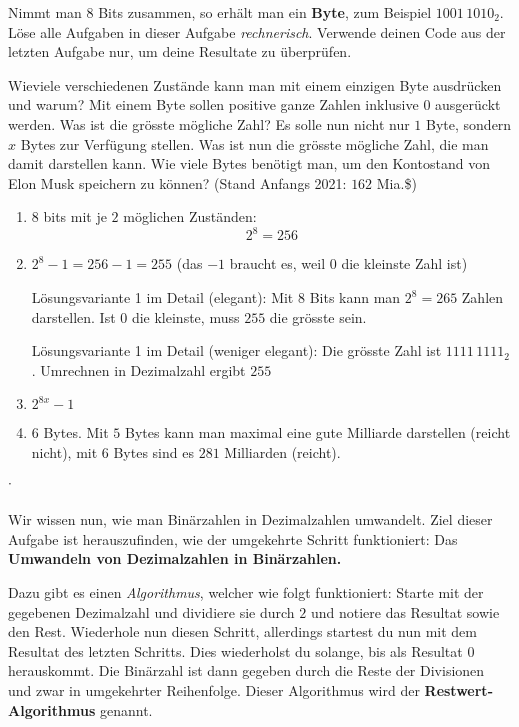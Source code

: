 \newpage

\begin{question}
	Nimmt man $8$ Bits zusammen, so erhält man ein \textbf{Byte}, zum Beispiel $1001\,1010_2$.
	Löse alle Aufgaben in dieser Aufgabe \textit{rechnerisch}. Verwende deinen Code aus der letzten Aufgabe nur, um deine Resultate zu überprüfen.
	\begin{tasks}
		\task Wieviele verschiedenen Zustände kann man mit einem einzigen Byte ausdrücken und warum?
		\task Mit einem Byte sollen positive ganze Zahlen inklusive $0$ ausgerückt werden. Was ist die grösste mögliche Zahl?
		\task Es solle nun nicht nur $1$ Byte, sondern $x$ Bytes zur Verfügung stellen. Was ist nun die grösste mögliche Zahl, die man damit darstellen kann.
		\task Wie viele Bytes benötigt man, um den Kontostand von Elon Musk speichern zu können? (Stand Anfangs 2021: $162$ Mia.\$)
	\end{tasks}
\end{question}
\cprotEnv\begin{solution}
	\begin{enumerate}[label=\alph*)]
		\item $8$ bits mit je $2$ möglichen Zuständen:
		$$2^8 = 256$$
		\item $2^8-1 = 256 - 1 = 255$ (das $-1$ braucht es, weil $0$ die kleinste Zahl ist)

		Lösungsvariante 1 im Detail (elegant): Mit $8$ Bits kann man $2^8 = 265$ Zahlen darstellen. Ist $0$ die kleinste, muss $255$ die grösste sein.

		Lösungsvariante 1 im Detail (weniger elegant):
		Die grösste Zahl ist $1111\,1111_2$. Umrechnen in Dezimalzahl ergibt $255$
		\item $2^{8x}-1$
		\item $6$ Bytes. Mit $5$ Bytes kann man maximal eine gute Milliarde darstellen (reicht nicht), mit $6$ Bytes sind es $281$ Milliarden (reicht).
	\end{enumerate}
\end{solution}

˙\newpage

Wir wissen nun, wie man Binärzahlen in Dezimalzahlen umwandelt.
Ziel dieser Aufgabe ist herauszufinden, wie der umgekehrte Schritt funktioniert: Das \textbf{Umwandeln von Dezimalzahlen in Binärzahlen.}

Dazu gibt es einen \textit{Algorithmus}, welcher wie folgt funktioniert: Starte mit der gegebenen Dezimalzahl und dividiere sie durch $2$ und notiere das Resultat sowie den Rest. Wiederhole nun diesen Schritt, allerdings startest du nun mit dem Resultat des letzten Schritts. Dies wiederholst du solange, bis als Resultat $0$ herauskommt. Die Binärzahl ist dann gegeben durch die Reste der Divisionen und zwar in umgekehrter Reihenfolge. Dieser Algorithmus wird der \textbf{Restwert-Algorithmus} genannt.

